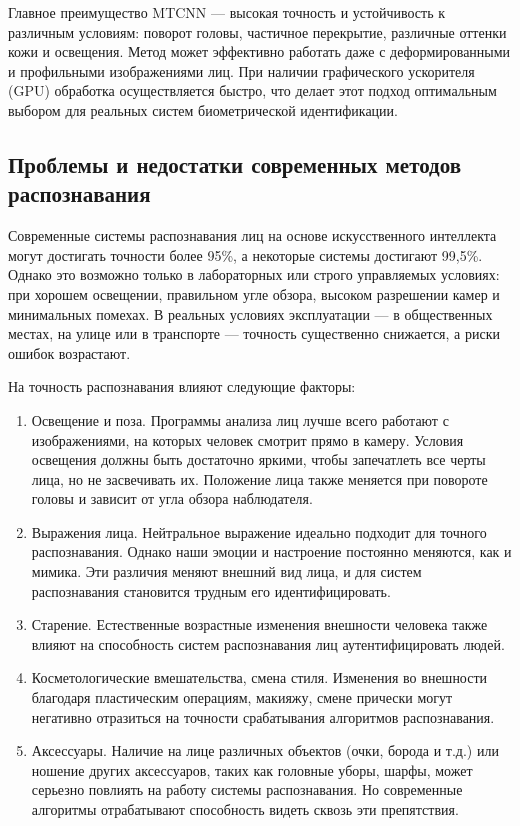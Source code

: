Главное преимущество MTCNN — высокая точность и устойчивость к различным условиям: поворот головы, частичное перекрытие, различные оттенки кожи и освещения. Метод может эффективно работать даже с деформированными и профильными изображениями лиц. При наличии графического ускорителя (GPU) обработка осуществляется быстро, что делает этот подход оптимальным выбором для реальных систем биометрической идентификации.

\subsection{Проблемы и недостатки современных методов распознавания}

Современные системы распознавания лиц на основе искусственного интеллекта могут достигать точности более 95\%, а некоторые системы достигают 99,5\%.\cite{abdulaev} Однако это возможно только в лабораторных или строго управляемых условиях: при хорошем освещении, правильном угле обзора, высоком разрешении камер и минимальных помехах. В реальных условиях эксплуатации — в общественных местах, на улице или в транспорте — точность существенно снижается, а риски ошибок возрастают.

На точность распознавания влияют следующие факторы:
\begin{enumerate}
	\item Освещение и поза. Программы анализа лиц лучше всего работают с изображениями, на которых человек смотрит прямо в камеру. Условия освещения должны быть достаточно яркими, чтобы запечатлеть все черты лица, но не засвечивать их. Положение лица также меняется при повороте головы и зависит от угла обзора наблюдателя. 
	\item Выражения лица. Нейтральное выражение идеально подходит для точного распознавания. Однако наши эмоции и настроение постоянно меняются, как и мимика. Эти различия меняют внешний вид лица, и для систем распознавания становится трудным его идентифицировать.
	\item Старение. Естественные возрастные изменения внешности человека также влияют на способность систем распознавания лиц аутентифицировать людей.
	\item Косметологические вмешательства, смена стиля.  Изменения во внешности благодаря пластическим операциям, макияжу, смене прически могут негативно отразиться на точности срабатывания алгоритмов  распознавания.
	\item Аксессуары. Наличие на лице различных объектов (очки, борода и т.д.) или ношение других аксессуаров, таких как головные уборы, шарфы, может серьезно повлиять на работу системы распознавания. Но современные алгоритмы отрабатывают способность видеть сквозь эти препятствия.\cite{abdulaev}
\end{enumerate}

